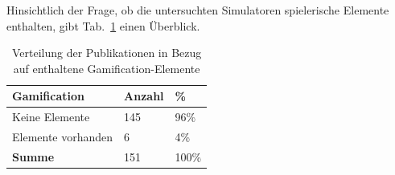 Hinsichtlich der Frage, ob die untersuchten Simulatoren spielerische Elemente enthalten, gibt Tab.~\ref{tab:gamification} einen Überblick.

\begin{table}[htbp]
    \centering
    \tiny
    \begin{tabularx}{\textwidth}{lXX}
        \hline
        \textbf{Gamification} & \textbf{Anzahl} & \textbf{\%} \\
        \hline
        Keine Elemente     & 145 & 96\% \\
        Elemente vorhanden & 6   & 4\%  \\
        \hline
        \textbf{Summe}     & 151 & 100\% \\
        \hline
    \end{tabularx}
    \caption{Verteilung der Publikationen in Bezug auf enthaltene Gamification-Elemente}
    \label{tab:gamification}
\end{table}

